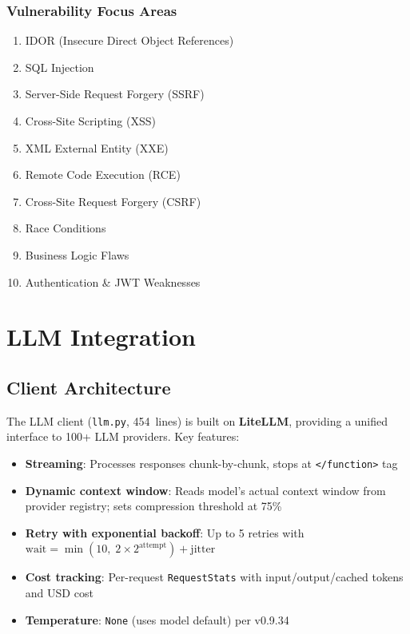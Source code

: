 \documentclass[12pt,a4paper]{report}
\begin{document}
\subsection{Vulnerability Focus Areas}
\begin{enumerate}[noitemsep]
  \item IDOR (Insecure Direct Object References)
  \item SQL Injection
  \item Server-Side Request Forgery (SSRF)
  \item Cross-Site Scripting (XSS)
  \item XML External Entity (XXE)
  \item Remote Code Execution (RCE)
  \item Cross-Site Request Forgery (CSRF)
  \item Race Conditions
  \item Business Logic Flaws
  \item Authentication \& JWT Weaknesses
\end{enumerate}


\chapter{LLM Integration}
\label{ch:llm}

\section{Client Architecture}
The LLM client (\texttt{llm.py}, 454~lines) is built on \textbf{LiteLLM}, providing
a unified interface to 100+ LLM providers. Key features:

\begin{itemize}[noitemsep]
  \item \textbf{Streaming}: Processes responses chunk-by-chunk, stops at
        \texttt{</function>} tag
  \item \textbf{Dynamic context window}: Reads model's actual context window from
        provider registry; sets compression threshold at 75\%
  \item \textbf{Retry with exponential backoff}: Up to 5 retries with
        $\text{wait} = \min(10,\; 2 \times 2^{\text{attempt}}) + \text{jitter}$
  \item \textbf{Cost tracking}: Per-request \texttt{RequestStats} with
        input/output/cached tokens and USD cost
  \item \textbf{Temperature}: \texttt{None} (uses model default) per v0.9.34
\end{itemize}
\end{document}
